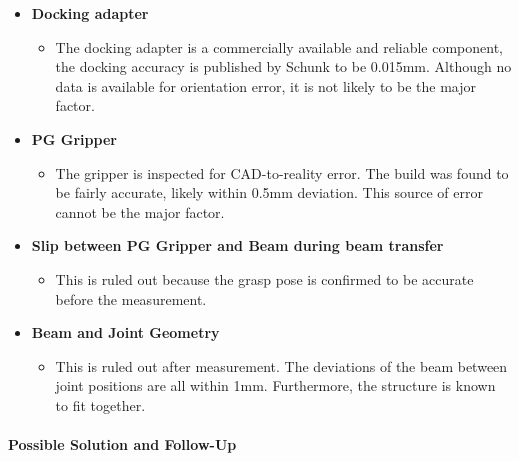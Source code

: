 {\begin{itemize}
\begin{itemize}
	\item Inaccuracy due to the mechanical system

	\item Inaccuracy due to the IK / FK conversion

\end{itemize}
	\item \textbf{Docking adapter}

\begin{itemize}
	\item The docking adapter is a commercially available and reliable component, the docking accuracy is published by Schunk to be 0.015mm. Although no data is available for orientation error, it is not likely to be the major factor.

\end{itemize}
    \item\textbf{PG Gripper}

\begin{itemize}
	\item The gripper is inspected for CAD-to-reality error. The build was found to be fairly accurate, likely within 0.5mm deviation. This source of error cannot be the major factor.

\end{itemize}
    \item\textbf{Slip between PG Gripper and Beam during beam transfer}

\begin{itemize}
	\item This is ruled out because the grasp pose is confirmed to be accurate before the measurement.

\end{itemize}
    \item\textbf{Beam and Joint Geometry}

\begin{itemize}
	\item This is ruled out after measurement. The deviations of the beam between joint positions are all within 1mm. Furthermore, the structure is known to fit together.

\end{itemize}
\end{itemize}

\paragraph{Possible Solution and Follow-Up}

}
